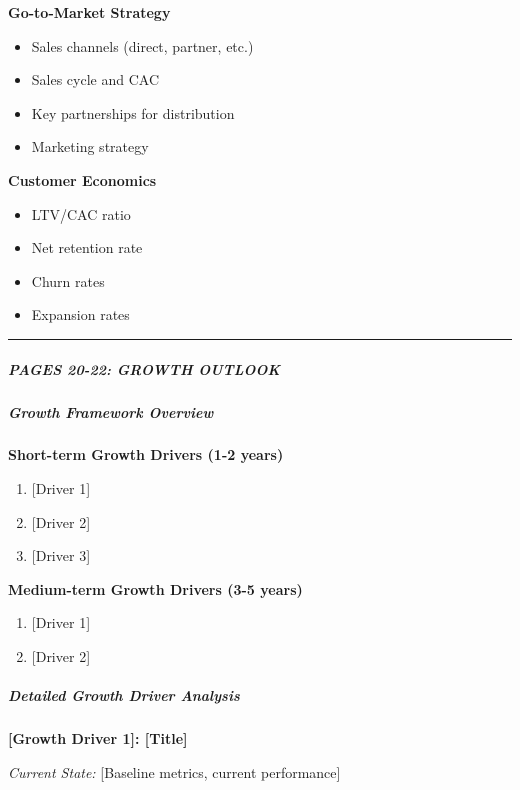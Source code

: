 \documentclass[11pt]{article}
\begin{document}
\textbf{Go-to-Market Strategy}

\begin{itemize}[leftmargin=*,itemsep=2pt,topsep=2pt]
\item {} Sales channels (direct, partner, etc.)
\item {} Sales cycle and CAC
\item {} Key partnerships for distribution
\item {} Marketing strategy
\end{itemize}

\textbf{Customer Economics}

\begin{itemize}[leftmargin=*,itemsep=2pt,topsep=2pt]
\item {} LTV/CAC ratio
\item {} Net retention rate
\item {} Churn rates
\item {} Expansion rates
\end{itemize}

\vspace{0.5em}\hrule\vspace{0.5em}

\subparagraph{PAGES 20-22: GROWTH OUTLOOK}\mbox{}\par

\subparagraph{Growth Framework Overview}\mbox{}\par

\textbf{Short-term Growth Drivers (1-2 years)}

\begin{enumerate}[leftmargin=*,itemsep=2pt,topsep=2pt]
\item {} [Driver 1]
\item {} [Driver 2]
\item {} [Driver 3]
\end{enumerate}

\textbf{Medium-term Growth Drivers (3-5 years)}

\begin{enumerate}[leftmargin=*,itemsep=2pt,topsep=2pt]
\item {} [Driver 1]
\item {} [Driver 2]
\end{enumerate}

\subparagraph{Detailed Growth Driver Analysis}\mbox{}\par

\textbf{[Growth Driver 1]: [Title]}


\emph{Current State:} [Baseline metrics, current performance]
\end{document}
